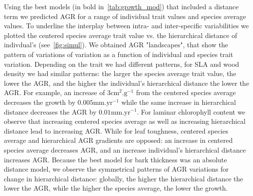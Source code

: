 Using the best models (in bold in~\autoref{tab:growth_mod}) that included a distance term we predicted AGR for a range of individual trait values and species average values. To underline the interplay between intra- and inter-specific variabilities we plotted the centered species average trait value vs. the hierarchical distance of indivdual's (see~\autoref{fig:simul}). We obtained AGR "landscapes", that show the pattern of variations of variation as a function of individual and species trait variation. Depending on the trait we had different patterns, for SLA and wood density we had similar patterns: the larger the species average trait value, the lower the AGR, and the higher the individual's hierarchical distance the lower the AGR. For example, an increase of $3\text{cm}^2.\text{g}^{-1}$ from the centered species average decreases the growth by $0.005\text{mm}.\text{yr}^{-1}$ while the same increase in hierarchical distance decreases the AGR by $0.01\text{mm}.\text{yr}^{-1}$. For laminar chlorophyll content we observe that increasing centered species average as well as increasing hierarchical distance lead to increasing AGR. While for leaf toughness, centered species average and hierarchical AGR gradients are opposed: an increase in centered species average decreases AGR, and an increase individual's hierarchical distance increases AGR. Because the best model for bark thickness was an absolute distance model, we observe the symmetrical patterns of AGR variations for change in hierarchical distance: globally, the higher the hierarchical distance the lower the AGR, while the higher the species average, the lower the growth.


